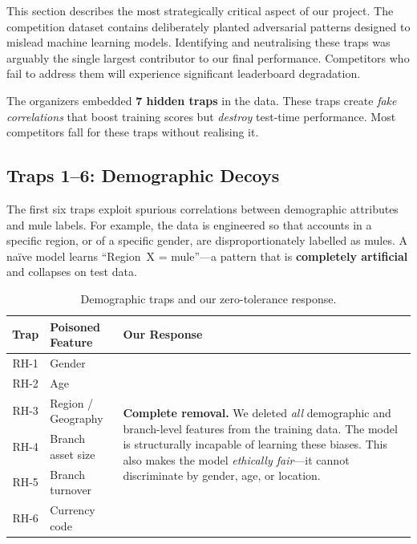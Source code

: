 \documentclass[11pt, a4paper]{article}
\begin{document}
This section describes the most strategically critical aspect of our project. The competition
dataset contains deliberately planted adversarial patterns designed to mislead machine
learning models. Identifying and neutralising these traps was arguably the single largest
contributor to our final performance. Competitors who fail to address them will experience
significant leaderboard degradation.

\begin{challengebox}
The organizers embedded \textbf{7 hidden traps} in the data. These traps create
\emph{fake correlations} that boost training scores but \emph{destroy} test-time
performance. Most competitors fall for these traps without realising it.
\end{challengebox}

\subsection{Traps 1--6: Demographic Decoys}

The first six traps exploit spurious correlations between demographic attributes and mule
labels. For example, the data is engineered so that accounts in a specific region, or of a
specific gender, are disproportionately labelled as mules. A na\"ive model learns ``Region~X
= mule''---a pattern that is \textbf{completely artificial} and collapses on test data.

\begin{table}[H]
\centering\small
\caption{Demographic traps and our zero-tolerance response.}
\begin{tabular}{@{}clp{7.5cm}@{}}
\toprule
\textbf{Trap} & \textbf{Poisoned Feature} & \textbf{Our Response} \\
\midrule
RH-1 & Gender           & \multirow{6}{7.5cm}{%
    \textbf{Complete removal.} We deleted \emph{all} demographic and branch-level
    features from the training data. The model is structurally incapable of learning
    these biases. This also makes the model \emph{ethically fair}---it cannot
    discriminate by gender, age, or location.} \\
RH-2 & Age              & \\
RH-3 & Region / Geography & \\
RH-4 & Branch asset size & \\
RH-5 & Branch turnover  & \\
RH-6 & Currency code    & \\
\bottomrule
\end{tabular}
\end{table}
\end{document}
